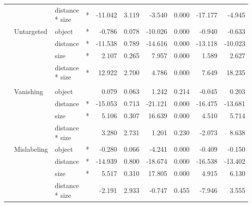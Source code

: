 \begin{longtable}[t]{llllrrrrrr}
\cmidrule{3-10}\nopagebreak
\hspace{1em} &  & distance * size & * & -11.042 & 3.119 & -3.540 & 0.000 & -17.177 & -4.945\\
\cmidrule{2-10}\nopagebreak
\hspace{1em} & Untargeted & object & * & -0.786 & 0.078 & -10.026 & 0.000 & -0.940 & -0.633\\
\cmidrule{3-10}\nopagebreak
\hspace{1em} &  & distance & * & -11.538 & 0.789 & -14.616 & 0.000 & -13.118 & -10.023\\
\cmidrule{3-10}\nopagebreak
\hspace{1em} &  & size & * & 2.107 & 0.265 & 7.957 & 0.000 & 1.589 & 2.627\\
\cmidrule{3-10}\nopagebreak
\hspace{1em} &  & distance * size & * & 12.922 & 2.700 & 4.786 & 0.000 & 7.649 & 18.235\\
\cmidrule{1-10}\pagebreak[0]
\addlinespace[0.3em]
\multicolumn{10}{l}{\textbf{SSD}}\\
\hspace{1em} & Vanishing & object &  & 0.079 & 0.063 & 1.242 & 0.214 & -0.045 & 0.203\\
\cmidrule{3-10}\nopagebreak
\hspace{1em} &  & distance & * & -15.053 & 0.713 & -21.121 & 0.000 & -16.475 & -13.681\\
\cmidrule{3-10}\nopagebreak
\hspace{1em} &  & size & * & 5.106 & 0.307 & 16.639 & 0.000 & 4.510 & 5.714\\
\cmidrule{3-10}\nopagebreak
\hspace{1em} &  & distance * size &  & 3.280 & 2.731 & 1.201 & 0.230 & -2.073 & 8.638\\
\cmidrule{2-10}\nopagebreak
\hspace{1em} & Mislabeling & object & * & -0.280 & 0.066 & -4.241 & 0.000 & -0.409 & -0.150\\
\cmidrule{3-10}\nopagebreak
\hspace{1em} &  & distance & * & -14.939 & 0.800 & -18.674 & 0.000 & -16.538 & -13.402\\
\cmidrule{3-10}\nopagebreak
\hspace{1em} &  & size & * & 5.517 & 0.310 & 17.805 & 0.000 & 4.915 & 6.130\\
\cmidrule{3-10}\nopagebreak
\hspace{1em} &  & distance * size &  & -2.191 & 2.933 & -0.747 & 0.455 & -7.946 & 3.555\\

\end{longtable}
